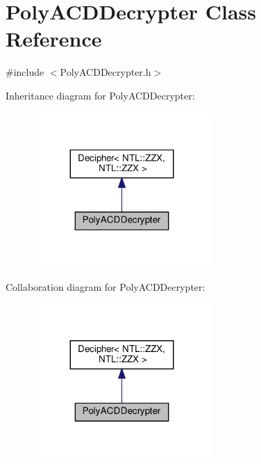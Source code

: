 \hypertarget{classPolyACDDecrypter}{}\section{Poly\+A\+C\+D\+Decrypter Class Reference}
\label{classPolyACDDecrypter}


{\ttfamily \#include $<$Poly\+A\+C\+D\+Decrypter.\+h$>$}



Inheritance diagram for Poly\+A\+C\+D\+Decrypter\+:\nopagebreak
\begin{figure}[H]
\begin{center}
\leavevmode
\includegraphics[width=191pt]{classPolyACDDecrypter__inherit__graph}
\end{center}
\end{figure}


Collaboration diagram for Poly\+A\+C\+D\+Decrypter\+:\nopagebreak
\begin{figure}[H]
\begin{center}
\leavevmode
\includegraphics[width=191pt]{classPolyACDDecrypter__coll__graph}
\end{center}
\end{figure}

